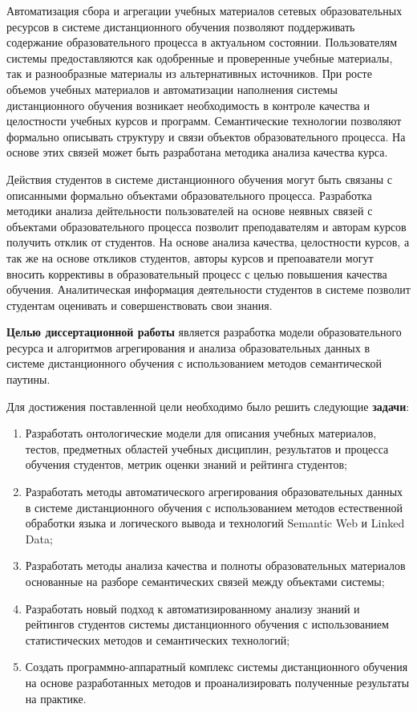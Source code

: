 Автоматизация сбора и агрегации учебных материалов сетевых образовательных ресурсов в системе дистанционного обучения позволяют поддерживать содержание образовательного процесса в актуальном состоянии. Пользователям системы предоставляются как одобренные и проверенные учебные материалы, так и разнообразные материалы из альтернативных источников. При росте объемов учебных материалов и автоматизации наполнения системы дистанционного обучения возникает необходимость в контроле качества и целостности учебных курсов и программ. Семантические технологии позволяют формально описывать структуру и связи объектов образовательного процесса. На основе этих связей может быть разработана методика анализа качества курса. 

Действия студентов в системе дистанционного обучения могут быть связаны с описанными формально объектами образовательного процесса. Разработка методики анализа дейтельности пользователей на основе неявных связей с объектами образовательного процесса позволит преподавателям и авторам курсов получить отклик от студентов. На основе анализа качества, целостности курсов, а так же на основе откликов студентов, авторы курсов и препоаватели могут вносить коррективы в образовательный процесс с целью повышения качества обучения. Аналитическая информация деятельности студентов в системе позволит студентам оценивать и совершенствовать свои знания.     

\textbf{Целью диссертационной работы} является разработка модели образовательного ресурса и алгоритмов агрегирования и анализа образовательных данных в системе дистанционного обучения с использованием методов семантической паутины. 

Для достижения поставленной цели необходимо было решить следующие \textbf{задачи}:
\begin{enumerate}
 \item Разработать онтологические модели для описания учебных материалов, тестов, предметных областей учебных дисциплин, результатов и процесса обучения студентов, метрик оценки знаний и рейтинга студентов;
 \item Разработать методы автоматического агрегирования образовательных данных в системе дистанционного обучения с использованием методов естественной обработки языка и логического вывода и технологий Semantic Web и Linked Data;
 \item Разработать методы анализа качества и полноты образовательных материалов основанные на разборе семантических связей между объектами системы;
  \item Разработать новый подход к автоматизированному анализу знаний и рейтингов студентов системы дистанционного обучения с использованием статистических методов и семантических технологий;
  \item Создать программно-аппаратный комплекс системы дистанционного обучения на основе разработанных методов и проанализировать полученные результаты на практике.  
 \end{enumerate}

